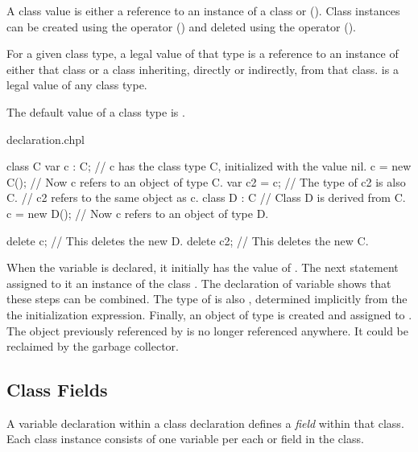 A class value is either a reference to an instance of a class
or  (). Class instances can be created
using the  operator () and deleted using
the  operator ().

For a given class type, a legal value of that type is a reference to
an instance of either that class or a class inheriting, directly or
indirectly, from that class.
 is a legal value of any class type.

The default value of a class type is .

\begin{chapelexample}{declaration.chpl}
\begin{chapel}
class C { }
var c : C;      // c has the class type C, initialized with the value nil.
c = new C();    // Now c refers to an object of type C.
var c2 = c;     // The type of c2 is also C.
                // c2 refers to the same object as c.
class D : C {}  // Class D is derived from C.
c = new D();    // Now c refers to an object of type D.
\end{chapel}
\begin{chapelpost}
delete c;   // This deletes the new D.
delete c2;  // This deletes the new C.
\end{chapelpost}
\begin{chapeloutput}
\end{chapeloutput}
When the variable  is declared, it initially has the value
of .  The next statement assigned to it an instance of the
class .  The declaration of variable  shows that these steps can
be combined.  The type of  is also , determined implicitly from
the the initialization expression.  Finally, an object of type  is created and
assigned to .  The object previously referenced by  is no longer
referenced anywhere. It could be reclaimed by the garbage collector.
\end{chapelexample}

\subsection{Class Fields}
\label{Class_Fields}

A variable declaration within a class declaration defines
a \emph{field} within that class.
Each class instance consists of one variable per each
 or  field in the class.


